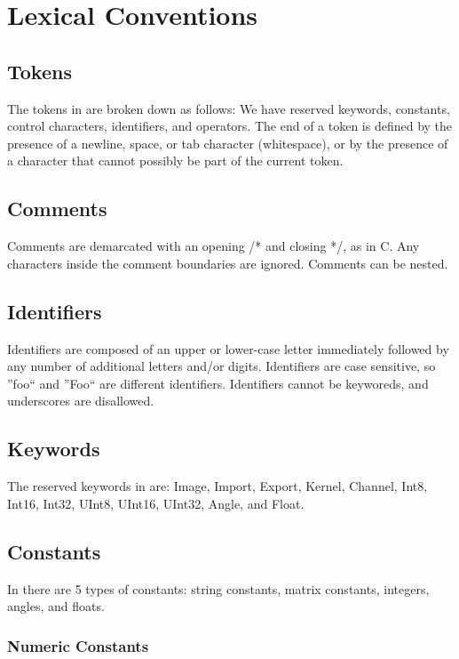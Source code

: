 \section{Lexical Conventions}
\label{sec:lex}

\subsection{Tokens}
\label{ssec:tokens}
The tokens in \sys{} are broken down as follows: We have reserved
keywords, constants, control characters, identifiers, and operators.
The end of a token is defined by the presence of a newline, space,
or tab character (whitespace), or by the presence of a character that
cannot possibly be part of the current token.

\subsection{Comments}
\label{ssec:comments}
Comments are demarcated with an opening /* and closing */, as in C.
Any characters inside the comment boundaries are ignored. Comments
can be nested.

\subsection{Identifiers}
\label{ssec:identifiers}
Identifiers are composed of an upper or lower-case letter immediately
followed by any number of additional letters and/or digits. Identifiers
are case sensitive, so ''foo`` and ''Foo`` are different identifiers.
Identifiers cannot be keyworeds, and underscores are disallowed.

\subsection{Keywords}
\label{ssec:keywords}
The reserved keywords in \sys{} are:
Image, Import, Export, Kernel, Channel, 
Int8, Int16, Int32, UInt8, UInt16, UInt32, Angle, and Float.


\subsection{Constants}
\label{ssec:constants}
In \sys{} there are 5 types of constants: string constants, matrix
constants, integers, angles, and floats.

\subsubsection{Numeric Constants}
\label{sssec:numericconstants}

